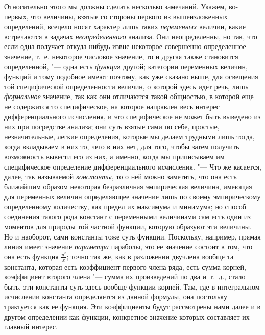 Относительно этого мы должны сделать несколько замечаний. Укажем, во-первых,
что величины, взятые со стороны первого из вышеизложенных определений,
всецело носят характер лишь таких {\em переменных}
величин, какие встречаются в задачах
{\em неопределенного} анализа. Они неопределенны, но
так, что если одна получает откуда-нибудь извне некоторое совершенно
определенное значение, т.~е. некоторое числовое значение, то и другая также
становится определенной, "--- одна есть {\em функция}
другой; категории переменных величин, функций и тому подобное имеют
поэтому, как уже сказано выше, для освещения той специфической
определенности величин, о которой здесь идет речь, лишь
{\em формальное} значение, так как они отличаются такой
общностью, в которой еще не содержится то специфическое, на которое
направлен весь интерес дифференциального исчисления, и это специфическое не
может быть выведено из них при посредстве анализа; они суть взятые сами по
себе, простые, незначительные, легкие определения, которые мы делаем
трудными лишь тогда, когда вкладываем в них то, чего в них нет, для того,
чтобы затем получить возможность вывести его из них, а именно, когда мы
приписываем им специфическое определение дифференциального
исчисления. "--- Что же касается, далее, так называемой {\em константы}, то
о ней можно заметить, что она есть ближайшим образом некоторая безразличная
эмпирическая величина, имеющая для переменных величин определяющее значение
лишь по своему эмпирическому определенному количеству, как предел их
максимума и минимума; но способ соединения такого рода констант с
переменными величинами сам есть один из моментов для природы той частной
функции, которую образуют эти величины. Но и наоборот, сами константы тоже
суть функции. Поскольку, например, прямая линия имеет значение
{\em параметра} параболы, это ее значение состоит в
том, что она есть функция $\frac{y^2} x$; точно так же, как в разложении
двучлена вообще та константа, которая есть коэффициент первого члена ряда,
есть сумма корней, коэффициент второго члена "--- сумма их произведений по
два и~т.~д., стало быть, эти константы суть здесь вообще функции корней. Там,
где в интегральном исчислении константа определяется из данной формулы, она
постольку трактуется как ее функция. Эти коэффициенты будут рассмотрены нами
далее и в другом определении как функции, конкретное значение которых
составляет их главный интерес.

